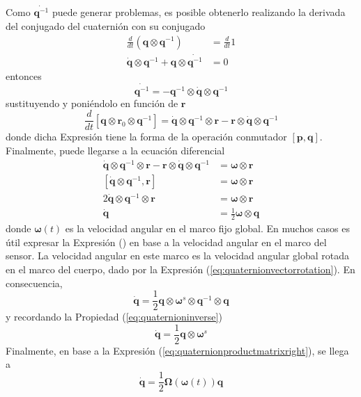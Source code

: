 Como $\dot{\bm{q}^{-1}}$ puede generar problemas, es posible obtenerlo realizando la derivada del conjugado del cuaternión con su conjugado
\begin{align}
    \frac{d}{dt}\left(\bm{q}\otimes\bm{q}^{-1}\right) &= \frac{d}{dt}1 \\
    \dot{\bm{q}}\otimes\bm{q}^{-1} + \bm{q}\otimes\dot{\bm{q}^{-1}} &= 0
\end{align}
entonces
\begin{equation}
    \dot{\bm{q}^{-1}} = -\bm{q}^{-1}\otimes\dot{\bm{q}}\otimes\bm{q}^{-1}
\end{equation}
sustituyendo y poniéndolo en función de $\bm{r}$
\begin{equation}
        \frac{d}{dt}\left[\bm{q}\otimes\bm{r}_0\otimes\bm{q}^{-1}\right] = \dot{\bm{q}}\otimes\bm{q}^{-1}\otimes\bm{r} - \bm{r}\otimes\dot{\bm{q}}\otimes\bm{q}^{-1}
\end{equation}
donde dicha Expresión tiene la forma de la operación conmutador $\left[\bm{p},\bm{q}\right]$. Finalmente, puede llegarse a la ecuación diferencial
\begin{align}
    \dot{\bm{q}}\otimes\bm{q}^{-1}\otimes\bm{r} - \bm{r}\otimes\dot{\bm{q}}\otimes\bm{q}^{-1} &= \bm{\omega}\otimes\bm{r} \\
    \left[\dot{\bm{q}}\otimes\bm{q}^{-1},\bm{r}\right] &= \bm{\omega}\otimes\bm{r} \\
    2\dot{\bm{q}}\otimes\bm{q}^{-1}\otimes\bm{r} &= \bm{\omega}\otimes\bm{r} \\
    \dot{\bm{q}} &= \frac{1}{2}\bm{\omega}\otimes\bm{q}
\end{align}
donde $\bm{\omega}(t)$ es la velocidad angular en el marco fijo global. En muchos casos es útil expresar la Expresión () en base a la velocidad angular en el marco del sensor. La velocidad angular en este marco es la velocidad angular global rotada en el marco del cuerpo, dado por la Expresión (\ref{eq:quaternionvectorrotation}). En consecuencia,
\begin{equation}
    \dot{\bm{q}} = \frac{1}{2}\bm{q}\otimes\bm{\omega}^s\otimes\bm{q}^{-1}\otimes\bm{q}
\end{equation}
y recordando la Propiedad (\ref{eq:quaternioninverse})
\begin{equation}
    \dot{\bm{q}} = \frac{1}{2}\bm{q}\otimes\bm{\omega}^s 
\end{equation}
Finalmente, en base a la Expresión (\ref{eq:quaternionproductmatrixright}), se llega a
\begin{equation}
    \dot{\bm{q}} = \frac{1}{2}\bm{\Omega}(\bm{\omega}(t))\bm{q}
    \label{eq:edoquaternion}
\end{equation}
